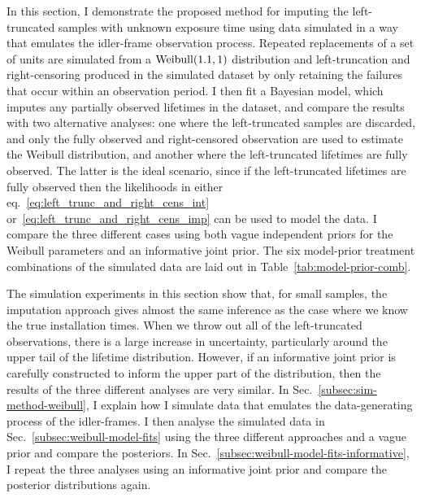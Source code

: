 In this section, I demonstrate the proposed method for imputing the left-truncated samples with unknown exposure time using data simulated in a way that emulates the idler-frame observation process. Repeated replacements of a set of units are simulated from a $\hbox{Weibull}(1.1, 1)$ distribution and left-truncation and right-censoring produced in the simulated dataset by only retaining the failures that occur within an observation period. I then fit a Bayesian model, which imputes any partially observed lifetimes in the dataset, and compare the results with two alternative analyses: one where the left-truncated samples are discarded, and only the fully observed and right-censored observation are used to estimate the Weibull distribution, and another where the left-truncated lifetimes are fully observed. The latter is the ideal scenario, since if the left-truncated lifetimes are fully observed then the likelihoods in either eq.~\eqref{eq:left_trunc_and_right_cens_int} or~\eqref{eq:left_trunc_and_right_cens_imp} can be used to model the data. I compare the three different cases using both vague independent priors for the Weibull parameters and an informative joint prior. The six model-prior treatment combinations of the simulated data are laid out in Table~\ref{tab:model-prior-comb}. 

The simulation experiments in this section show that, for small samples, the imputation approach gives almost the same inference as the case where we know the true installation times. When we throw out all of the left-truncated observations, there is a large increase in uncertainty, particularly around the upper tail of the lifetime distribution. However, if an informative joint prior is carefully constructed to inform the upper part of the distribution, then the results of the three different analyses are very similar. In Sec.~\ref{subsec:sim-method-weibull}, I explain how I simulate data that emulates the data-generating process of the idler-frames. I then analyse the simulated data in Sec.~\ref{subsec:weibull-model-fits} using the three different approaches and a vague prior and compare the posteriors. In Sec.~\ref{subsec:weibull-model-fits-informative}, I repeat the three analyses using an informative joint prior and compare the posterior distributions again.


